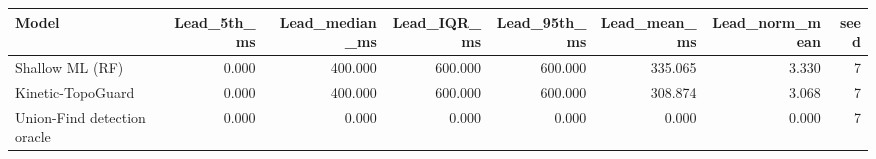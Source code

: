 \begin{tabular}{lrrrrrrr}
\toprule
Model & Lead\_5th\_ms & Lead\_median\_ms & Lead\_IQR\_ms & Lead\_95th\_ms & Lead\_mean\_ms & Lead\_norm\_mean & seed \\
\midrule
Shallow ML (RF) & 0.000 & 400.000 & 600.000 & 600.000 & 335.065 & 3.330 & 7 \\
Kinetic-TopoGuard & 0.000 & 400.000 & 600.000 & 600.000 & 308.874 & 3.068 & 7 \\
Union-Find detection oracle & 0.000 & 0.000 & 0.000 & 0.000 & 0.000 & 0.000 & 7 \\
\bottomrule
\end{tabular}
